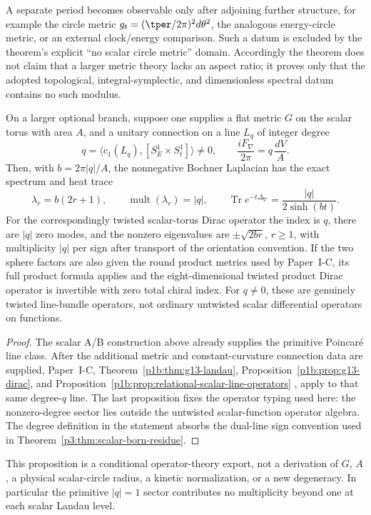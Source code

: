 \documentclass[11pt,a4paper]{article}
\begin{document}
A separate period becomes observable only after adjoining further structure,
for example the circle metric
\(g_t=(\tper/2\pi)^2d\theta^2\), the analogous energy-circle metric, or an
external clock/energy comparison.  Such a datum is excluded by the theorem's
explicit ``no scalar circle metric'' domain.  Accordingly the theorem does
not claim that a larger metric theory lacks an aspect ratio; it proves only
that the adopted topological, integral-symplectic, and dimensionless spectral
datum contains no such modulus.

\begin{proposition}
\label{p3a:prop:v212-scalar-line-spectrum-handoff}
On a larger optional branch, suppose one supplies a flat metric \(G\) on the
scalar torus with area \(A\), and a unitary connection on a line \(L_q\) of
integer degree
\[
 q=\bigl\langle c_1(L_q),[S_E^1\times S_t^1]\bigr\rangle\ne0,
 \qquad \frac{iF_\nabla}{2\pi}=q\,\frac{dV}{A}.
\]
Then, with \(b=2\pi|q|/A\), the nonnegative Bochner Laplacian has the exact
spectrum and heat trace
\[
 \lambda_r=b(2r+1),\qquad
 \operatorname{mult}(\lambda_r)=|q|,\qquad
 \operatorname{Tr}e^{-t\Delta_\nabla}=\frac{|q|}{2\sinh(bt)}.
\]
For the correspondingly twisted scalar-torus Dirac operator the index is
\(q\), there are \(|q|\) zero modes, and the nonzero eigenvalues are
\(\pm\sqrt{2br}\), \(r\ge1\), with multiplicity \(|q|\) per sign after
transport of the orientation convention.  If the two sphere factors are
also given the round product metrics used by Paper~I-C, its full product
formula applies and the eight-dimensional twisted product Dirac operator is
invertible with zero total chiral index.  For \(q\ne0\), these are genuinely
twisted line-bundle operators, not ordinary untwisted scalar differential
operators on functions.
\end{proposition}
\begin{proof}
The scalar A/B construction above already supplies the primitive Poincar\'e
line class.  After the additional metric and constant-curvature connection
data are supplied, Paper~I-C, Theorem~\ref{p1b:thm:g13-landau},
Proposition~\ref{p1b:prop:g13-dirac}, and
Proposition~\ref{p1b:prop:relational-scalar-line-operators}
\cite{Kugelmann2026Paper1C}, apply to that same degree-\(q\) line.
The last proposition fixes the operator typing used here: the nonzero-degree
sector lies outside the untwisted scalar-function operator algebra.  The degree definition in the statement absorbs the dual-line
sign convention used in Theorem~\ref{p3:thm:scalar-born-residue}.
\end{proof}
This proposition is a conditional operator-theory export, not a derivation of
\(G\), \(A\), a physical scalar-circle radius, a kinetic normalization, or a
new degeneracy.  In particular the primitive \(|q|=1\) sector contributes no
multiplicity beyond one at each scalar Landau level.
\end{document}
